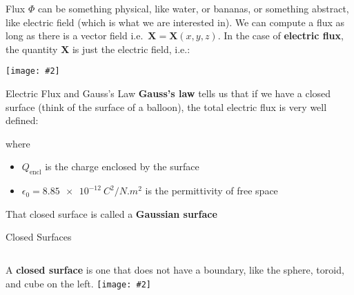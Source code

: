 \documentclass[12pt,aspectratio=169]{beamer}
\newcommand{\pic}[2]{\texttt{[image: \#2]}}
\newcommand{\mb}[1]{\mathbf{#1}}
\newcommand{\eq}[2]{\vspace{#1}{\Large\begin{displaymath}#2\end{displaymath}}}
\begin{document}
\begin{frame}{Flux}
  \vspace{.2in}$\Phi$ can be something physical, like water, or bananas, or
  something abstract, like electric field (which is what we are interested
  in). We can compute a flux as long as there is a vector field i.e.\
  $\mb{X}=\mb{X}(x,y,z)$. In the case of \textbf{electric flux}, the quantity
  $\mb{X}$ is just the
  electric field, i.e.:
    
  \eq{-.2in}{
    \Phi_q=\int\mb{E}\cdot d\mb{A}
  }
  \begin{center}
    \pic{.3}{eflux.png}
  \end{center}
\end{frame}



\begin{frame}{Electric Flux and Gauss's Law}
  \textbf{Gauss's law} tells us that if we have a closed surface (think of
  the surface of a balloon), the total electric flux is very well defined:

  \eq{-.2in}{
    \boxed{
      \Phi_q
      =\oint\mb{E}\cdot d\mb{A}
      =\frac{Q_\mathrm{encl}}{\epsilon_0}
    }
  }
    
  where
  \begin{itemize}
  \item $Q_\mathrm{encl}$ is the charge enclosed by the surface
  \item $\epsilon_0=\SI{8.85e-12}{C^2/N.m^2}$ is the permittivity of free space
  \end{itemize}
  That closed surface is called a \textbf{Gaussian surface}
\end{frame}



\begin{frame}{Closed Surfaces}
  \begin{columns}
    A \textbf{closed surface} is one that does not have a boundary, like the
    sphere, toroid, and cube on the left.
    \pic{1}{800px-SurfacesWithAndWithoutBoundary.png}
  \end{columns}
\end{frame}
\end{document}
